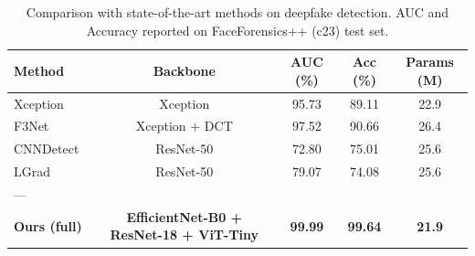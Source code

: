 \usepackage{booktabs}
\usepackage{multirow}


\begin{table}[h]
\centering
\caption{Comparison with state-of-the-art methods on deepfake detection. AUC and Accuracy reported on FaceForensics++ (c23) test set.}
\label{tab:main_comparison}
\begin{tabular}{lcccc}
\toprule
\textbf{Method} & \textbf{Backbone} & \textbf{AUC (\%)} & \textbf{Acc (\%)} & \textbf{Params (M)} \\
\midrule
Xception~\cite{rossler2019faceforensics} & Xception & 95.73 & 89.11 & 22.9 \\
F3Net~\cite{qian2020thinking} & Xception + DCT & 97.52 & 90.66 & 26.4 \\
CNNDetect~\cite{wang2020cnn} & ResNet-50 & 72.80 & 75.01 & 25.6 \\
LGrad~\cite{tan2023learning} & ResNet-50 & 79.07 & 74.08 & 25.6 \\
--- \\
\textbf{Ours (full)} & \textbf{EfficientNet-B0 + ResNet-18 + ViT-Tiny} & \textbf{99.99} & \textbf{99.64} & \textbf{21.9} \\
\bottomrule
\end{tabular}
\end{table}

